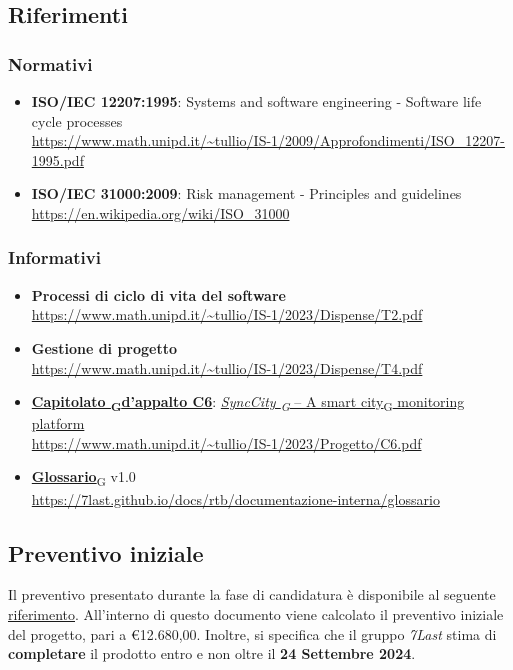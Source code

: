 \subsection{Riferimenti}
\subsubsection{Normativi} 
\begin{itemize}
	\item \textbf{ISO/IEC 12207:1995}: Systems and software engineering - Software life cycle processes \\\url{https://www.math.unipd.it/~tullio/IS-1/2009/Approfondimenti/ISO_12207-1995.pdf}
	\item \textbf{ISO/IEC 31000:2009}: Risk management - Principles and guidelines \\\url{https://en.wikipedia.org/wiki/ISO_31000}
\end{itemize}
\subsubsection{Informativi}
\begin{itemize}
	\item \textbf{Processi di ciclo di vita del software} \\
	      \url{https://www.math.unipd.it/~tullio/IS-1/2023/Dispense/T2.pdf}
	\item \textbf{Gestione di progetto} \\
	      \url{https://www.math.unipd.it/~tullio/IS-1/2023/Dispense/T4.pdf}
	\item \href{https://7last.github.io/docs/rtb/documentazione-interna/glossario\#capitolato}{\textbf{Capitolato \textsubscript{G}d'appalto C6}}: \href{https://7last.github.io/docs/rtb/documentazione-interna/glossario\#synccity}{\textit{SyncCity \textsubscript{G}} – A \href{https://7last.github.io/docs/rtb/documentazione-interna/glossario\#smart-city}{smart city\textsubscript{G}} monitoring platform}\\
	      \url{https://www.math.unipd.it/~tullio/IS-1/2023/Progetto/C6.pdf}
	\item \href{https://7last.github.io/docs/rtb/documentazione-interna/glossario\#glossario}{\textbf{Glossario}\textsubscript{G}} v1.0\\
	      \url{https://7last.github.io/docs/rtb/documentazione-interna/glossario}
\end{itemize}

\subsection{Preventivo iniziale}
Il preventivo presentato durante la fase di candidatura è disponibile al seguente \uline{\href{https://7last.github.io/docs/candidatura/preventivo-costi-assunzione-impegni}{riferimento}}.
All'interno di questo documento viene calcolato il preventivo iniziale del progetto, pari a €12.680,00.
Inoltre, si specifica che il gruppo \textit{7Last} stima di \textbf{completare} il prodotto entro e non oltre il \textbf{24 Settembre 2024}.
